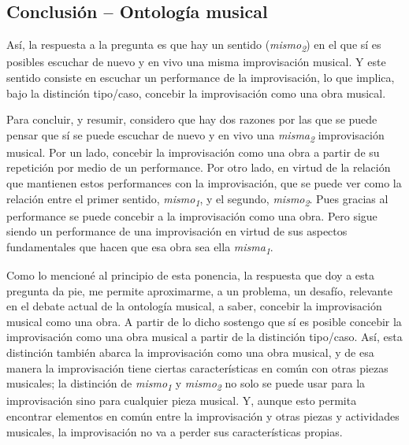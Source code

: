 \documentclass[]{book}
\begin{document}
\begin{refsection}
\section*{Conclusión -- Ontología musical}

Así, la respuesta a la pregunta es que hay un sentido
(\emph{mismo\textsubscript{2}}) en el que sí es posibles escuchar de
nuevo y en vivo una misma improvisación musical. Y este sentido consiste
en escuchar un performance de la improvisación, lo que implica, bajo la
distinción tipo/caso, concebir la improvisación como una obra musical.

Para concluir, y resumir, considero que hay dos razones por las que se
puede pensar que sí se puede escuchar de nuevo y en vivo una
\emph{misma\textsubscript{2 }}improvisación musical. Por un lado,
concebir la improvisación como una obra a partir de su repetición por
medio de un performance. Por otro lado, en virtud de la relación que
mantienen estos performances con la improvisación, que se puede ver como
la relación entre el primer sentido, \emph{mismo\textsubscript{1}}, y el
segundo, \emph{mismo\textsubscript{2}}. Pues gracias al performance se
puede concebir a la improvisación como una obra. Pero sigue siendo un
performance de una improvisación en virtud de sus aspectos fundamentales
que hacen que esa obra sea ella \emph{misma\textsubscript{1}}.

Como lo mencioné al principio de esta ponencia, la respuesta que doy a
esta pregunta da pie, me permite aproximarme, a un problema, un desafío,
relevante en el debate actual de la ontología musical, a saber, concebir
la improvisación musical como una obra. A partir de lo dicho sostengo
que sí es posible concebir la improvisación como una obra musical a
partir de la distinción tipo/caso. Así, esta distinción también abarca
la improvisación como una obra musical, y de esa manera la improvisación
tiene ciertas características en común con otras piezas musicales; la
distinción de \emph{mismo\textsubscript{1 }}y
\emph{mismo\textsubscript{2}} no solo se puede usar para la
improvisación sino para cualquier pieza musical. Y, aunque esto permita
encontrar elementos en común entre la improvisación y otras piezas y
actividades musicales, la improvisación no va a perder sus
características propias.

\nocite{Alperson1984}
\nocite{Alperson2010}
\nocite{Bertinetto2012}
\nocite{Brown2000}
\nocite{Kania2017}
\nocite{Wetzel2014}

\printbibliography[heading=subbibliography,title={Referencias}]

\end{refsection}
\end{document}
